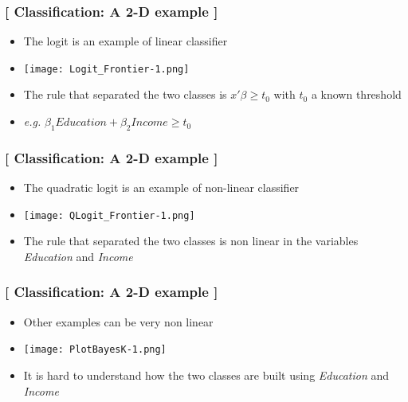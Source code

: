 \documentclass[xcolor=x11names,compress, handhouts]{beamer}
\renewcommand{\(}{\begin{columns}}
\renewcommand{\)}{\end{columns}}
\newcommand{\<}[1]{\begin{column}{#1}}
\renewcommand{\>}{\end{column}}
\begin{document}
\begin{frame} %
\frametitle{\textcolor{brique}{[ Classification:  A 2-D example ]}}
\pause
\begin{itemize}[<+->]
  \item The logit is an example of linear classifier
  \item[] \begin{center}\texttt{[image: Logit\_Frontier-1.png]} \end{center}
  \item The rule that separated the two classes is $ x'\beta \geq t_0$ with $t_0$ a known threshold
  \item[]\textit{e.g.} $\beta_1 Education + \beta_2 Income \geq t_0$

\end{itemize}
\end{frame}

\begin{frame} %
\frametitle{\textcolor{brique}{[ Classification:  A 2-D example ]}}
\pause
\begin{itemize}[<+->]
  \item The quadratic logit is an example of non-linear classifier
  \item[] \begin{center}\texttt{[image: QLogit\_Frontier-1.png]} \end{center}
  \item The rule that separated the two classes is non linear in the variables \textit{Education}  and \textit{Income}
\end{itemize}
\end{frame}

\begin{frame} %
\frametitle{\textcolor{brique}{[ Classification:  A 2-D example ]}}
\pause
\begin{itemize}[<+->]
  \item Other examples can be very non linear
  \item[] \begin{center}\texttt{[image: PlotBayesK-1.png]} \end{center}
  \item It is hard to understand how the two classes  are built using \textit{Education}  and \textit{Income}
\end{itemize}
\end{frame}
\end{document}
